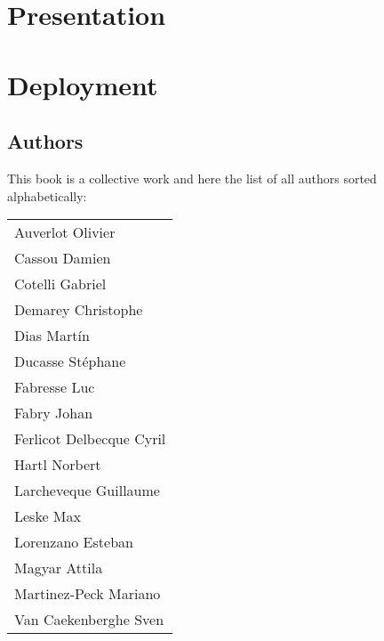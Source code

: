 \documentclass[10pt,twoside,showtrims]{support/latex/sbabook}
\begin{document}
\part{Presentation}










\part{Deployment}



\appendix
\appendixpage

\chapter{Authors}

This book is a collective work and here the list of all authors sorted alphabetically:

\begin{tabular}{l}
Auverlot Olivier  \\
Cassou Damien\\
Cotelli Gabriel\\
Demarey Christophe\\
Dias Martín\\
Ducasse Stéphane\\
Fabresse Luc\\
Fabry Johan\\
Ferlicot Delbecque Cyril\\
Hartl Norbert\\
Larcheveque Guillaume\\
Leske Max\\
Lorenzano Esteban\\
Magyar Attila\\
Martinez-Peck Mariano\\
Van Caekenberghe Sven\\
\end{tabular}

\backmatter
\end{document}
